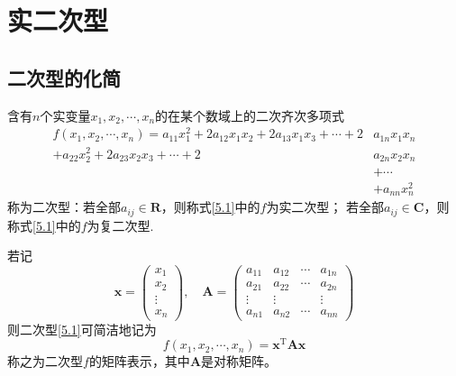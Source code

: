 \section{实二次型}
\subsection{二次型的化简}
\begin{definition}[二次型]
    含有$n$个实变量$x_1,x_2,\cdots,x_n$的在某个数域上的二次齐次多项式
    \begin{equation}\label{5.1}\tag{5.1}
        \begin{split}
        f(x_1,x_2,\cdots,x_n)=a_{11}x_1^2+2a_{12}x_1x_2+2a_{13}x_1x_3+\cdots+2&a_{1n}x_1x_n \\
        +a_{22}x_2^2+2a_{23}x_2x_3+\cdots+2&a_{2n}x_2x_n\\
        &+\cdots\\
        &+a_{nn}x_n^2
        \end{split}
    \end{equation}
    称为{\heiti 二次型}：若全部$a_{ij}\in \mathbf{R}$，则称式\eqref{5.1}中的$f$为{\heiti 实二次型}；
    若全部$a_{ij}\in \mathbf{C}$，则称式\eqref{5.1}中的$f$为{\heiti 复二次型}.
\end{definition}

\begin{definition}
    若记
    $$\boldsymbol{x}=\left(\begin{array}{c}
        x_1\\
        x_2\\
        \vdots\\
        x_n
    \end{array}\right),\quad
    \boldsymbol{A}=\left(\begin{array}{cccc}
        a_{11} & a_{12} & \cdots & a_{1n}\\
        a_{21} & a_{22} & \cdots & a_{2n}\\
        \vdots & \vdots &  &\vdots\\
        a_{n1} & a_{n2} & \cdots & a_{nn}
    \end{array}\right)$$
    则二次型\eqref{5.1}可简洁地记为
    \begin{equation}\label{5.2}\tag{5.2}
        f(x_1,x_2,\cdots,x_n)=\boldsymbol{x}^\mathrm{T}\boldsymbol{A}\boldsymbol{x}
    \end{equation}
    称之为{\heiti 二次型$f$的矩阵表示}，其中$\boldsymbol{A}$是对称矩阵。
\end{definition}

